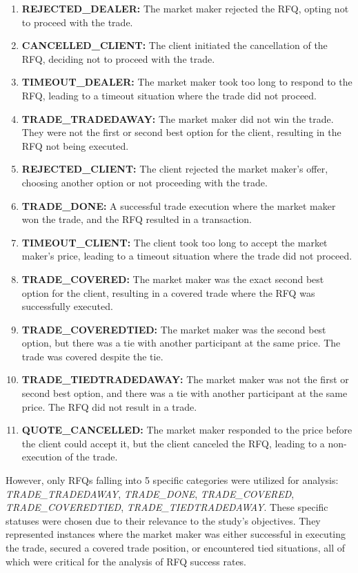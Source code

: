 \begin{enumerate}
    \item \textbf{REJECTED\_DEALER:} The market maker rejected the RFQ, opting not to proceed with the trade.
    \item \textbf{CANCELLED\_CLIENT:} The client initiated the cancellation of the RFQ, deciding not to proceed with the trade.
    \item \textbf{TIMEOUT\_DEALER:} The market maker took too long to respond to the RFQ, leading to a timeout situation where the trade did not proceed.
    \item \textbf{TRADE\_TRADEDAWAY:} The market maker did not win the trade. They were not the first or second best option for the client, resulting in the RFQ not being executed.
    \item \textbf{REJECTED\_CLIENT:} The client rejected the market maker's offer, choosing another option or not proceeding with the trade.
    \item \textbf{TRADE\_DONE:} A successful trade execution where the market maker won the trade, and the RFQ resulted in a transaction.
    \item \textbf{TIMEOUT\_CLIENT:} The client took too long to accept the market maker's price, leading to a timeout situation where the trade did not proceed.
    \item \textbf{TRADE\_COVERED:} The market maker was the exact second best option for the client, resulting in a covered trade where the RFQ was successfully executed.
    \item \textbf{TRADE\_COVEREDTIED:} The market maker was the second best option, but there was a tie with another participant at the same price. The trade was covered despite the tie.
    \item \textbf{TRADE\_TIEDTRADEDAWAY:} The market maker was not the first or second best option, and there was a tie with another participant at the same price. The RFQ did not result in a trade.
    \item \textbf{QUOTE\_CANCELLED:} The market maker responded to the price before the client could accept it, but the client canceled the RFQ, leading to a non-execution of the trade.
\end{enumerate}

However, only RFQs falling into 5 specific categories were utilized for analysis: \textit{TRADE\_\-TRADED\-AWAY}, \textit{TRADE\_DONE}, \textit{TRADE\_COVERED}, \textit{TRADE\_COVEREDTIED}, \textit{TRADE\_TIED\-TRADED\-AWAY}. These specific statuses were chosen due to their relevance to the study's objectives. They represented instances where the market maker was either successful in executing the trade, secured a covered trade position, or encountered tied situations, all of which were critical for the analysis of RFQ success rates.

